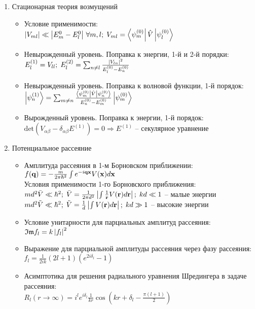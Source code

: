 \begin{enumerate}[label=\textbf{\underline{\arabic*.}}]
\item Стационарная теория возмущений  \begin{itemize}
            \item Условие применимости: \\
            $ \abs{V_{ml}} \ll \abs{E_m^0 - E_l^0}\, \forall m,l;\; V_{ml}=\matrixel{\psi_m^{(0)}}{\hat{V}}{\psi_l^{(0)}} $
            \item Невырожденный уровень. Поправка к энергии, 1-й и 2-й порядки: \\
            $ E_l^{(1)} = V_{ll};\; E_l^{(2)} = \sum_{n \neq l} \frac{\left| V_{ln} \right|^2}{E_l^{(0)} - E_n^{(0)}} $
            \item Невырожденный уровень. Поправка к волновой функции, 1-й порядок: \\
            $ \ket{\psi_n^{(1)}} = \sum_{m \neq n} \frac{\matrixel{\psi_m^{(0)}}{\hat{V}}{\psi_n^{(0)}}}{E_n^{(0)} - E_m^{(0)}}\ket{\psi^{(0)}_m} $
            \item Вырожденный уровень. Поправка к энергии, 1-й порядок: \\
            $ \text{det}(V_{\alpha\beta} - \delta_{\alpha\beta}E^{(1)})=0 \Rightarrow E^{(1)} $ -- секулярное уравнение

        \end{itemize}
\item Потенциальное рассеяние  \begin{itemize}
            \item Амплитуда рассеяния в 1-м Борновском приближении: \\
            $ f(\mathbf{q}) = -\frac{m}{2\pi\hbar^2}\int e^{-i\mathbf{q}\mathbf{x}} V(\mathbf{x})d\mathbf{x} $ \\
            Условия применимости 1-го Борновского приближения: \\
            $ md^2\bar{V} \ll \hbar^2;\; \bar{V} = \frac1{2\pi d^2} \left| \int \frac1{\mathbf{r}}V(\mathbf{r})d\mathbf{r} \right|;\; kd \ll 1 $ -- малые энергии \\
            $ md^2\tilde{V} \ll \hbar^2;\; \tilde{V} = \frac1{d} \left| \int V(\mathbf{r})d\mathbf{r} \right|;\; kd \gg 1 $ -- высокие энергии \\
            \item Условие унитарности для парциальных амплитуд рассеяния: \\
            $ \mathfrak{Im}{f_l} = k \left| f_l \right|^2 $
            \item Выражение для парциальной амплитуды рассеяния через фазу рассеяния: \\
            $ f_l = \frac1{2ik}(2l+1)(e^{2i\delta_l} - 1) $
            \item Асимптотика для решения радиального уравнения Шредингера в задаче рассеяния: \\
            $ R_l(r \rightarrow \infty) = i^l e^{i\delta_l} \frac1{kr} \cos(kr+\delta_l - \frac{\pi(l+1)}{2}) $


\end{itemize}
\end{enumerate}
